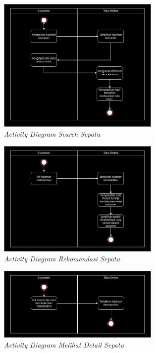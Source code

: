 \documentclass[journal,article,submit,pdftex,moreauthors]{Definitions/mdpi}
\begin{document}
\begin{figure}[H]
    \centering
    \includegraphics[width=0.7\textwidth]{images/activitysearchprodukdiagram.png}
    \captionsetup{justification=centering}
    \caption{\textit{Activity Diagram Search Sepatu}}
    \label{fig:activity-checkout}
\end{figure}

\begin{figure}[H]
    \centering
    \includegraphics[width=0.7\textwidth]{images/activitylihatrekomendasidiagram.png}
    \captionsetup{justification=centering}
    \caption{\textit{Activity Diagram Rekomendasi Sepatu}}
    \label{fig:activity-payment}
\end{figure}

\begin{figure}[H]
    \centering
    \includegraphics[width=0.7\textwidth]{images/activitylihatdetailsepatudiagram.png}
    \captionsetup{justification=centering}
    \caption{\textit{Activity Diagram Melihat Detail Sepatu}}
    \label{fig:activity-order}
\end{figure}
\end{document}
